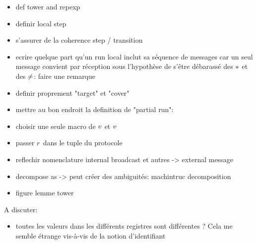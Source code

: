 \begin{itemize}
\item def tower and repexp
\item definir local step
\item s'assurer de la coherence step / transition
\item ecrire quelque part qu'un run local inclut sa séquence de messages car un seul message convient par réception sous l'hypothèse de s'être débarassé des ${*}$ et des ${\ne}$: faire une remarque \label{rem:local_transition_unique_message}
\item definir proprement "target" et "cover"
\item mettre au bon endroit la definition de "partial run": 
    \item choisir une seule macro de $v$ et $v$
    \item passer $r$ dans le tuple du protocole
    \item reflechir nomenclature internal broadcast et autres -> external message
    \item decompose as -> peut créer des ambiguités: machintruc decomposition 
    \item figure lemme tower
\end{itemize}

A discuter:
\begin{itemize}
\item toutes les valeurs dans les différents registres sont différentes ? Cela me semble étrange vis-à-vis de la notion d'identifiant


\end{itemize}